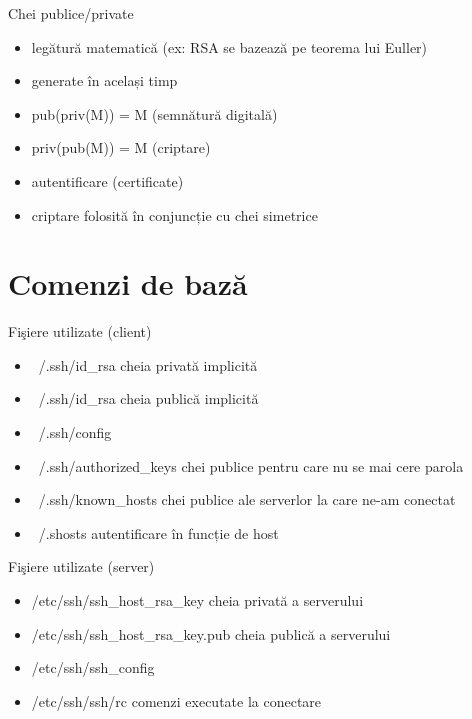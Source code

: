 \documentclass{beamer}
\begin{document}
\begin{frame}{Chei publice/private}
  \begin{itemize}
    \item legătură matematică (ex: RSA se bazează pe teorema lui Euller)
    \item generate în același timp
    \item pub(priv(M)) = M (semnătură digitală)
    \item priv(pub(M)) = M (criptare)
    \item autentificare (certificate)
    \item criptare folosită în conjuncție cu chei simetrice
  \end{itemize}
\end{frame}

\section{Comenzi de bază}
\frame{\tableofcontents[currentsection]}

\begin{frame}{Fişiere utilizate (client)}
	\begin{itemize}
		\item ~/.ssh/id\_rsa cheia privată implicită
		\item ~/.ssh/id\_rsa cheia publică implicită
		\item ~/.ssh/config 
		\item ~/.ssh/authorized\_keys chei publice pentru care nu se mai cere
			parola
		\item ~/.ssh/known\_hosts chei publice ale serverlor la care ne-am
			conectat
		\item ~/.shosts autentificare în funcție de host
	\end{itemize}
\end{frame}

\begin{frame}{Fişiere utilizate (server)}
	\begin{itemize}
		\item /etc/ssh/ssh\_host\_rsa\_key cheia privată a serverului
		\item /etc/ssh/ssh\_host\_rsa\_key.pub cheia publică a serverului
		\item /etc/ssh/ssh\_config
		\item /etc/ssh/ssh/rc	comenzi executate la conectare
	\end{itemize}
\end{frame}
\end{document}
